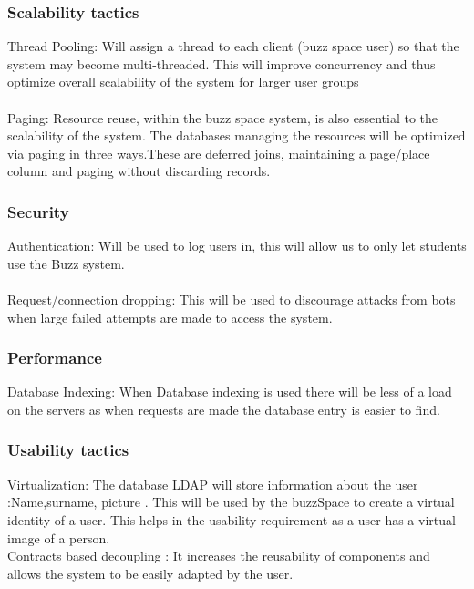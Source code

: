 \subsubsection{Scalability tactics}
Thread Pooling: Will assign a thread to each client (buzz space user) so that the system may become multi-threaded. This will improve concurrency and thus optimize overall scalability of the system for larger user groups\\
\\  
Paging: Resource reuse, within the buzz space system, is also essential to the scalability of the system. The databases managing the resources will be optimized via paging in three ways.These are deferred joins, maintaining a page/place column and paging without discarding records.\\
\subsubsection{Security}  
Authentication: Will be used to log users in, this will allow us to only let students use the Buzz system.\\
\\
Request/connection dropping: This will be used to discourage attacks from bots when large failed attempts are made to access the system.\\
\subsubsection{Performance}
Database Indexing: When Database indexing is used there will be less of a load on the servers as when requests are made the database entry is easier to find.
\subsubsection{Usability tactics}
Virtualization: The database LDAP will store information about the user :Name,surname, picture . This will be used by the buzzSpace to create a virtual identity of a user. This helps in the usability requirement as a user has a virtual image of a person.\\
Contracts based decoupling : It increases the reusability of components and allows the system to be easily adapted by the user.\\
